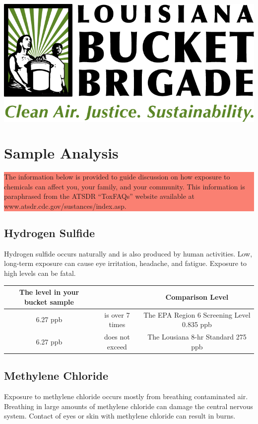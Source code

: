 \documentclass{article}
\newcommand{\fc}{\cellcolor{red}}
\newcommand{\highlightbox}[1]{\colorbox{salmon}{\parbox{\linewidth}{#1}}}
\begin{document}
\newpage
\includegraphics{logo}
\section*{Sample Analysis}

\highlightbox{The information below is provided to guide discussion on how
exposure to chemicals can affect you, your family, and your
community. This information is paraphrased from the ATSDR “ToxFAQs”
website available at www.atsdr.cdc.gov/sustances/index.asp.}

\subsection*{Hydrogen Sulfide}

Hydrogen sulfide occurs naturally and is also produced by human
activities. Low, long-term exposure can cause eye irritation, headache,
and fatigue. Exposure to high levels can be fatal.

\begin{tabular}{|c|c|c|}
\hline
The level in your bucket sample &                 & Comparison Level                             \\
\hline
\fc 6.27 ppb        & \fc is over 7 times         & \fc The EPA Region 6 Screening Level 0.835 ppb   \\
\hline
6.27 ppb                        & does not exceed & The Lousiana 8-hr Standard 275 ppb           \\
\hline
\end{tabular}

\subsection*{Methylene Chloride}

Exposure to methylene chloride occurs mostly from breathing
contaminated air. Breathing in large amounts of methylene chloride can
damage the central nervous system. Contact of eyes or skin with
methylene chloride can result in burns.
\end{document}
